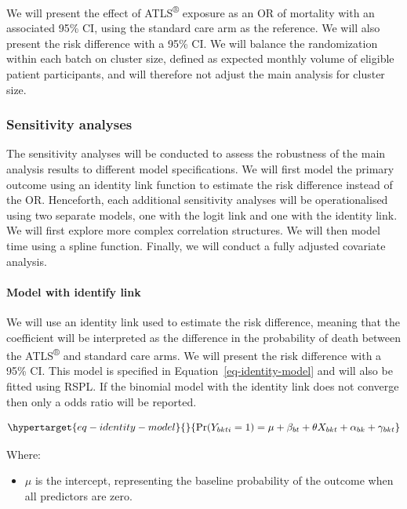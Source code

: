 \documentclass[
]{scrartcl}
\let\oldparagraph\paragraph
\renewcommand{\paragraph}[1]{\oldparagraph{#1}\mbox{}}
\providecommand{\tightlist}{%
  \setlength{\itemsep}{0pt}\setlength{\parskip}{0pt}}\usepackage{longtable,booktabs,array}
\begin{document}
We will present the effect of ATLS\textsuperscript{®} exposure as an OR
of mortality with an associated 95\% CI, using the standard care arm as
the reference. We will also present the risk difference with a 95\% CI.
We will balance the randomization within each batch on cluster size,
defined as expected monthly volume of eligible patient participants, and
will therefore not adjust the main analysis for cluster size.

\hypertarget{sensitivity-analyses}{%
\subsubsection{Sensitivity analyses}\label{sensitivity-analyses}}

The sensitivity analyses will be conducted to assess the robustness of
the main analysis results to different model specifications. We will
first model the primary outcome using an identity link function to
estimate the risk difference instead of the OR. Henceforth, each
additional sensitivity analyses will be operationalised using two
separate models, one with the logit link and one with the identity link.
We will first explore more complex correlation structures. We will then
model time using a spline function. Finally, we will conduct a fully
adjusted covariate analysis.

\hypertarget{model-with-identify-link}{%
\paragraph{Model with identify link}\label{model-with-identify-link}}

We will use an identity link used to estimate the risk difference,
meaning that the coefficient will be interpreted as the difference in
the probability of death between the ATLS\textsuperscript{®} and
standard care arms. We will present the risk difference with a 95\% CI.
This model is specified in Equation~\ref{eq-identity-model} and will
also be fitted using RSPL. If the binomial model with the identity link
does not converge then only a odds ratio will be reported.

\begin{equation}\protect\hypertarget{eq-identity-model}{}{
\text{Pr}(Y_{bkti} = 1) = \mu + \beta_{bt} + \theta X_{bkt} + \alpha_{bk} + \gamma_{bkt} 
}\label{eq-identity-model}\end{equation}

Where:

\begin{itemize}
\tightlist
\item
  \(\mu\) is the intercept, representing the baseline probability of the
  outcome when all predictors are zero.
\end{itemize}
\end{document}
